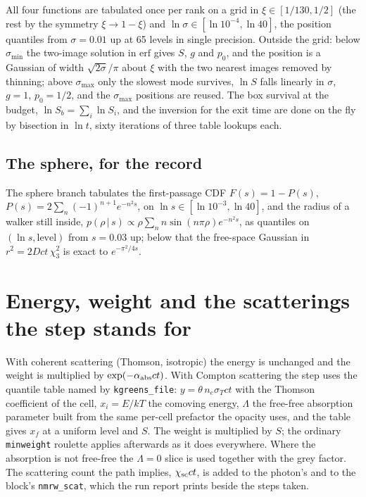 \documentclass[11pt]{article}
\newcommand{\key}[1]{\texttt{#1}}
\begin{document}
All four functions are tabulated once per rank on a grid in $\xi\in[1/130,1/2]$ (the
rest by the symmetry $\xi\to1-\xi$) and $\ln\sigma\in[\ln10^{-4},\ln40]$, the position
quantiles from $\sigma=0.01$ up at 65 levels in single precision.  Outside the grid:
below $\sigma_{\min}$ the two-image solution in $\mathrm{erf}$ gives $S$, $g$ and
$p_0$, and the position is a Gaussian of width $\sqrt{2\sigma}/\pi$ about $\xi$ with the
two nearest images removed by thinning; above $\sigma_{\max}$ only the slowest mode
survives, $\ln S$ falls linearly in $\sigma$, $g=1$, $p_0=1/2$, and the $\sigma_{\max}$
positions are reused.  The box survival at the budget, $\ln S_b=\sum_i\ln S_i$, and the
inversion for the exit time are done on the fly by bisection in $\ln t$, sixty
iterations of three table lookups each.

\subsection{The sphere, for the record}

The sphere branch tabulates the first-passage CDF $F(s)=1-P(s)$,
$P(s)=2\sum_n(-1)^{n+1}e^{-n^2s}$, on $\ln s\in[\ln10^{-3},\ln40]$, and the radius of a
walker still inside, $p(\rho\,|\,s)\propto\rho\sum_nn\sin(n\pi\rho)e^{-n^2s}$, as
quantiles on $(\ln s,\text{level})$ from $s=0.03$ up; below that the free-space Gaussian
in $r^2=2Dct\,\chi^2_3$ is exact to $e^{-\pi^2/4s}$.

\section{Energy, weight and the scatterings the step stands for}
\label{sec:energy}

With coherent scattering (Thomson, isotropic) the energy is unchanged and the weight is
multiplied by $\exp(-\alpha_{\rm abs}ct)$.  With Compton scattering the step uses the
quantile table named by \key{kgreens\_file}: $y=\theta\,n_e\sigma_Tct$ with the Thomson
coefficient of the cell, $x_i=E/kT$ the comoving energy, $\Lambda$ the free-free
absorption parameter built from the same per-cell prefactor the opacity uses, and the
table gives $x_f$ at a uniform level and $S$.  The weight is multiplied by $S$; the
ordinary \key{minweight} roulette applies afterwards as it does everywhere.  Where the
absorption is not free-free the $\Lambda=0$ slice is used together with the grey factor.
The scattering count the path implies, $\chi_{\rm sc}ct$, is added to the photon's and
to the block's \texttt{nmrw\_scat}, which the run report prints beside the steps taken.
\end{document}

